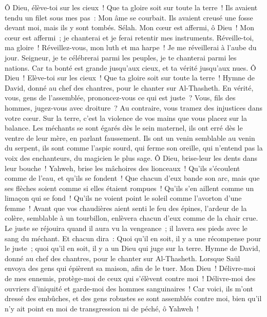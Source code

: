 \begin{multicols}{2}
Ô Dieu, élève-toi sur les cieux~! Que ta gloire soit sur toute la terre~!
Ils avaient tendu un filet sous mes pas~: Mon âme se courbait. Ils avaient creusé une fosse devant moi, mais ils y sont tombés. Sélah.
Mon cœur est affermi, ô Dieu~! Mon cœur est affermi~; je chanterai et je ferai retentir mes instruments.
Réveille-toi, ma gloire~! Réveillez-vous, mon luth et ma harpe~! Je me réveillerai à l'aube du jour.
Seigneur, je te célébrerai parmi les peuples, je te chanterai parmi les nations.
Car ta bonté est grande jusqu'aux cieux, et ta vérité jusqu'aux nues.
Ô Dieu~! Elève-toi sur les cieux~! Que ta gloire soit sur toute la terre~!
\VerseOne{}Hymne de David, donné au chef des chantres, pour le chanter sur Al-Thasheth.
En vérité, vous, gens de l'assemblée, prononcez-vous ce qui est juste~? Vous, fils des hommes, jugez-vous avec droiture~?
Au contraire, vous tramez des injustices dans votre cœur. Sur la terre, c'est la violence de vos mains que vous placez sur la balance.
Les méchants se sont égarés dès le sein maternel, ils ont erré dès le ventre de leur mère, en parlant faussement.
Ils ont un venin semblable au venin du serpent, ils sont comme l'aspic sourd, qui ferme son oreille,
qui n'entend pas la voix des enchanteurs, du magicien le plus sage.
Ô Dieu, brise-leur les dents dans leur bouche~! Yahweh, brise les mâchoires des lionceaux~!
Qu'ils s'écoulent comme de l'eau, et qu'ils se fondent~! Que chacun d'eux bande son arc, mais que ses flèches soient comme si elles étaient rompues~!
Qu'ils s'en aillent comme un limaçon qui se fond~! Qu'ils ne voient point le soleil comme l'avorton d'une femme~!
Avant que vos chaudières aient senti le feu des épines, l'ardeur de la colère, semblable à un tourbillon, enlèvera chacun d'eux comme de la chair crue.
Le juste se réjouira quand il aura vu la vengeance~; il lavera ses pieds avec le sang du méchant.
Et chacun dira~: Quoi qu'il en soit, il y a une récompense pour le juste~; quoi qu'il en soit, il y a un Dieu qui juge sur la terre.
\VerseOne{}Hymne de David, donné au chef des chantres, pour le chanter sur Al-Thasheth. Lorsque Saül envoya des gens qui épièrent sa maison, afin de le tuer.
Mon Dieu~! Délivre-moi de mes ennemis, protège-moi de ceux qui s'élèvent contre moi~!
Délivre-moi des ouvriers d'iniquité et garde-moi des hommes sanguinaires~!
Car voici, ils m'ont dressé des embûches, et des gens robustes se sont assemblés contre moi, bien qu'il n'y ait point en moi de transgression ni de péché, ô Yahweh~!

\end{multicols}
